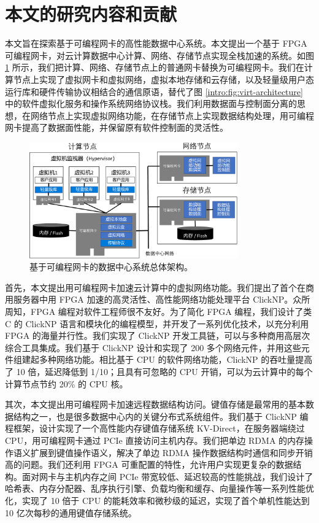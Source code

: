 \section{本文的研究内容和贡献}


本文旨在探索基于可编程网卡的高性能数据中心系统。本文提出一个基于 FPGA 可编程网卡，对云计算数据中心计算、网络、存储节点实现全栈加速的系统。如图 \ref{intro:fig:accel-arch} 所示，我们把计算、网络、存储节点上的普通网卡替换为可编程网卡。我们在计算节点上实现了虚拟网卡和虚拟网络，虚拟本地存储和云存储，以及轻量级用户态运行库和硬件传输协议相结合的通信原语，替代了图 \ref{intro:fig:virt-architecture} 中的软件虚拟化服务和操作系统网络协议栈。我们利用数据面与控制面分离的思想，在网络节点上实现虚拟网络功能，在存储节点上实现数据结构处理，用可编程网卡提高了数据面性能，并保留原有软件控制面的灵活性。


\begin{figure}[htbp]
	\centering
	\includegraphics[width=0.8\textwidth]{figures/accel_arch.pdf}
	\caption{基于可编程网卡的数据中心系统总体架构。}
	\label{intro:fig:accel-arch}
\end{figure}

首先，本文提出用可编程网卡加速云计算中的虚拟网络功能。我们提出了首个在商用服务器中用 FPGA 加速的高灵活性、高性能网络功能处理平台 ClickNP。众所周知，FPGA 编程对软件工程师很不友好。为了简化 FPGA 编程，我们设计了类 C 的 ClickNP 语言和模块化的编程模型，并开发了一系列优化技术，以充分利用 FPGA 的海量并行性。我们实现了 ClickNP 开发工具链，可以与多种商用高层次综合工具集成。我们基于 ClickNP 设计和实现了 200 多个网络元件，并用这些元件组建起多种网络功能。相比基于 CPU 的软件网络功能，ClickNP 的吞吐量提高了 10 倍，延迟降低到 1/10；且具有可忽略的 CPU 开销，可以为云计算中的每个计算节点节约 20\% 的 CPU 核。

其次，本文提出用可编程网卡加速远程数据结构访问。键值存储是最常用的基本数据结构之一，也是很多数据中心内的关键分布式系统组件。我们基于 ClickNP 编程框架，设计实现了一个高性能内存键值存储系统 KV-Direct，在服务器端绕过 CPU，用可编程网卡通过 PCIe 直接访问主机内存。我们把单边 RDMA 的内存操作语义扩展到键值操作语义，解决了单边 RDMA 操作数据结构时通信和同步开销高的问题。我们还利用 FPGA 可重配置的特性，允许用户实现更复杂的数据结构。面对网卡与主机内存之间 PCIe 带宽较低、延迟较高的性能挑战，我们设计了哈希表、内存分配器、乱序执行引擎、负载均衡和缓存、向量操作等一系列性能优化，实现了 10 倍于 CPU 的能耗效率和微秒级的延迟，实现了首个单机性能达到 10 亿次每秒的通用键值存储系统。

